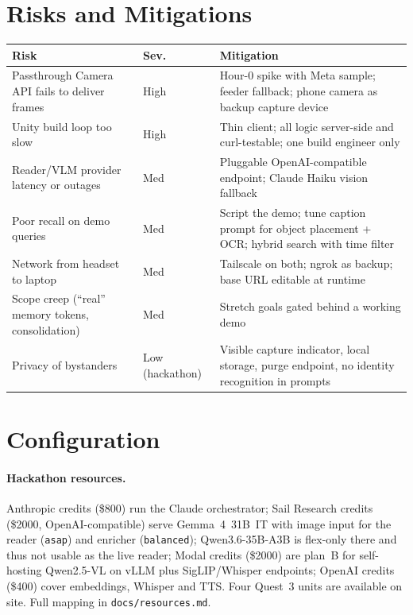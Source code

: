 \documentclass[11pt,a4paper]{article}
\begin{document}
\section{Risks and Mitigations}
\begin{center}
\begin{tabular}{P{0.34\textwidth}P{0.08\textwidth}P{0.5\textwidth}}
\toprule
\textbf{Risk} & \textbf{Sev.} & \textbf{Mitigation} \\
\midrule
Passthrough Camera API fails to deliver frames & High & Hour-0 spike with Meta sample; feeder fallback; phone camera as backup capture device \\
Unity build loop too slow & High & Thin client; all logic server-side and curl-testable; one build engineer only \\
Reader/VLM provider latency or outages & Med & Pluggable OpenAI-compatible endpoint; Claude Haiku vision fallback \\
Poor recall on demo queries & Med & Script the demo; tune caption prompt for object placement + OCR; hybrid search with time filter \\
Network from headset to laptop & Med & Tailscale on both; ngrok as backup; base URL editable at runtime \\
Scope creep (``real'' memory tokens, consolidation) & Med & Stretch goals gated behind a working demo \\
Privacy of bystanders & Low (hackathon) & Visible capture indicator, local storage, purge endpoint, no identity recognition in prompts \\
\bottomrule
\end{tabular}
\end{center}

\section{Configuration}
\paragraph{Hackathon resources.} Anthropic credits (\$800) run the Claude orchestrator; Sail Research credits (\$2000, OpenAI-compatible) serve Gemma~4~31B~IT with image input for the reader (\texttt{asap}) and enricher (\texttt{balanced}); Qwen3.6-35B-A3B is flex-only there and thus not usable as the live reader; Modal credits (\$2000) are plan~B for self-hosting Qwen2.5-VL on vLLM plus SigLIP/Whisper endpoints; OpenAI credits (\$400) cover embeddings, Whisper and TTS. Four Quest~3 units are available on site. Full mapping in \texttt{docs/resources.md}.
\end{document}
